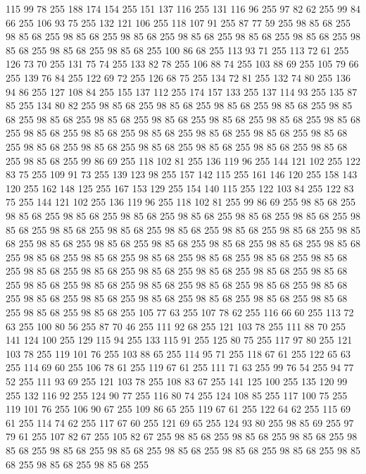 115 99 78 255 188 174 154 255 151 137 116 255 131 116 96 255 97 82 62 255 99 84 66 255 106 93 75 255 132 121 106 255 118 107 91 255 87 77 59 255 98 85 68 255 98 85 68 255 98 85 68 255 98 85 68 255 98 85 68 255 98 85 68 255 98 85 68 255 98 85 68 255 98 85 68 255 98 85 68 255 100 86 68 255 113 93 71 255 113 72 61 255 126 73 70 255 131 75 74 255 133 82 78 255 106 88 74 255 103 88 69 255 105 79 66 255 139 76 84 255 122 69 72 255 126 68 75 255 134 72 81 255 132 74 80 255 136 94 86 255 127 108 84 255 155 137 112 255 174 157 133 255 137 114 93 255 135 87 85 255 134 80 82 255 98 85 68 255 98 85 68 255 98 85 68 255 98 85 68 255 98 85 68 255 98 85 68 255 98 85 68 255 98 85 68 255 98 85 68 255 98 85 68 255 98 85 68 255 98 85 68 255 98 85 68 255 98 85 68 255 98 85 68 255 98 85 68 255 98 85 68 255 98 85 68 255 98 85 68 255 98 85 68 255 98 85 68 255 98 85 68 255 98 85 68 255
98 85 68 255 99 86 69 255 118 102 81 255 136 119 96 255 144 121 102 255 122 83 75 255 109 91 73 255 139 123 98 255 157 142 115 255 161 146 120 255 158 143 120 255 162 148 125 255 167 153 129 255 154 140 115 255 122 103 84 255 122 83 75 255 144 121 102 255 136 119 96 255 118 102 81 255 99 86 69 255 98 85 68 255 98 85 68 255 98 85 68 255 98 85 68 255 98 85 68 255 98 85 68 255 98 85 68 255 98 85 68 255 98 85 68 255 98 85 68 255 98 85 68 255 98 85 68 255 98 85 68 255 98 85 68 255 98 85 68 255 98 85 68 255 98 85 68 255 98 85 68 255 98 85 68 255 98 85 68 255 98 85 68 255 98 85 68 255 98 85 68 255 98 85 68 255 98 85 68 255 98 85 68 255 98 85 68 255 98 85 68 255 98 85 68 255 98 85 68 255 98 85 68 255 98 85 68 255 98 85 68 255 98 85 68 255 98 85 68 255 98 85 68 255 98 85 68 255 98 85 68 255 98 85 68 255 98 85 68 255 98 85 68 255 98 85 68 255 98 85 68 255 98 85 68 255
98 85 68 255 98 85 68 255 105 77 63 255 107 78 62 255 116 66 60 255 113 72 63 255 100 80 56 255 87 70 46 255 111 92 68 255 121 103 78 255 111 88 70 255 141 124 100 255 129 115 94 255 133 115 91 255 125 80 75 255 117 97 80 255 121 103 78 255 119 101 76 255 103 88 65 255 114 95 71 255 118 67 61 255 122 65 63 255 114 69 60 255 106 78 61 255 119 67 61 255 111 71 63 255 99 76 54 255 94 77 52 255 111 93 69 255 121 103 78 255 108 83 67 255 141 125 100 255 135 120 99 255 132 116 92 255 124 90 77 255 116 80 74 255 124 108 85 255 117 100 75 255 119 101 76 255 106 90 67 255 109 86 65 255 119 67 61 255 122 64 62 255 115 69 61 255 114 74 62 255 117 67 60 255 121 69 65 255 124 93 80 255 98 85 69 255 97 79 61 255 107 82 67 255 105 82 67 255 98 85 68 255 98 85 68 255 98 85 68 255 98 85 68 255 98 85 68 255 98 85 68 255 98 85 68 255 98 85 68 255 98 85 68 255 98 85 68 255 98 85 68 255 98 85 68 255
